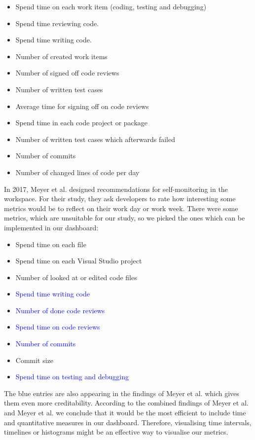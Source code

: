 \documentclass{seal_article}
\begin{document}
	\begin{itemize}
		\item Spend time on each work item (coding, testing and debugging)
		\item Spend time reviewing code.
		\item Spend time writing code.
		\item Number of created work items
		\item Number of signed off code reviews
		\item Number of written test cases
		\item Average time for signing off on code reviews
		\item Spend time in each code project or package
		\item Number of written test cases which afterwards failed
		\item Number of commits
		\item Number of changed lines of code per day
	\end{itemize}
	In 2017, Meyer et al. \cite{Meyer:2017:DRS:3171581.3134714} designed recommendations for self-monitoring in the workspace. For their study, they ask developers to rate how interesting some metrics would be to reflect on their work day or work week. There were some metrics, which are unsuitable for our study, so we picked the ones which can be implemented in our dashboard:
	\begin{itemize}
		\item Spend time on each file
		\item Spend time on each Visual Studio project
		\item Number of looked at or edited code files
		\item \textcolor{blue}{Spend time writing code}
		\item \textcolor{blue}{Number of done code reviews}
		\item \textcolor{blue}{Spend time on code reviews}
		\item \textcolor{blue}{Number of commits}
		\item Commit size
		\item \textcolor{blue}{Spend time on testing and debugging}
	\end{itemize}
	The blue entries are also appearing in the findings of Meyer et al. \cite{Meyer:2014:SDP:2635868.2635892} which gives them even more creditability. 
	According to the combined findings of Meyer et al. \cite{Meyer:2014:SDP:2635868.2635892} and Meyer et al. \cite{Meyer:2017:DRS:3171581.3134714} we conclude that it would be the most efficient to include time and quantitative measures in our dashboard. Therefore, visualising time intervals, timelines or histograms might be an effective way to visualise our metrics. 
\end{document}
